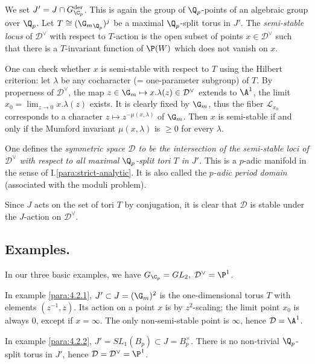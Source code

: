 \begin{para}\label{para:5.2.2}
 We set $J'=J\cap G_{\C_p}^{\mathrm{der}}$. This is
 again the group of $\Q_p$-points of an algebraic group over $\Q_p$. Let
 $T\cong ({\G_m}_{\Q_p})^j$ be a maximal $\Q_p$-split torus in $J'$. The
 {\it semi-stable locus} of $\mathcal{D}^\vee$ with respect to $T$-action
 is the open subset of points $x\in \mathcal{D}^\vee$ such that there is
 a $T$-invariant function of $\P(W)$ which does not vanish on $x$.


 One can check whether $x$ is semi-stable with respect to $T$ using the
 Hilbert criterion: let $\lambda$ be any cocharacter (= one-parameter
 subgroup) of $T$. By properness of $\mathcal{D}^\vee$, the map $z\in
 \G_m\mapsto x.\lambda(z)\in \mathcal{D}^\vee$ extends to $\A^1$, \ie the
 limit $\displaystyle x_0=\lim_{z\rightarrow 0} x.\lambda(z)$ exists. It
 is clearly fixed by $\G_m$, thus the fiber $\mathcal{L}_{x_0 }$
 corresponds to a character $z\mapsto z^{-\mu(x,\lambda)}$ of
 $\G_m$. Then $x$ is semi-stable if and only if the Mumford invariant
 $\mu(x,\lambda)$ is $\geq 0$ for every $\lambda$.
\end{para}

\begin{para}\label{para:5.2.3} One defines the {\it symmetric space
 $\mathcal{D}$ to be the intersection of the semi-stable loci 
 of $\mathcal{D}^\vee$ with respect to all maximal $\Q_p$-split tori $T$
 in $J'$.} This is a $p$-adic manifold in the sense of
 I.\ref{para:strict-analytic}.  It is
 also called the {\it $p$-adic period domain} (associated with the moduli
 problem).


 Since $J$ acts on the set of tori $T$ by conjugation, it is clear that
 $\mathcal{D}$ is stable under the $J$-action on $\mathcal{D}^{\vee}$.
\end{para}

 
\subsection{Examples.}\label{sub:5.3}

\begin{para}\label{para:5.3.1} In our three basic examples, we have
$G_{\C_p}=GL_2,\;\mathcal{D}^\vee=\P^1$.


In example \ref{para:4.2.1}, $J'\subset J=(\G_m)^2$ is the one-dimensional torus
$T$ with elements $(z^{-1},z)$. Its action on a point $x$ is by
$z^2$-scaling; the limit point $x_0$ is always $0$, except if
$x=\infty$. The only non-semi-stable point is $\infty$, hence
$\mathcal{D}=\A^1$.



In example \ref{para:4.2.2}, $J'=SL_1(B_p)\subset J=B_p^\times$. There is no
 non-trivial $\Q_p$-split torus in $J'$, hence
 $\mathcal{D}=\mathcal{D}^{\vee}=\P^1$.


\end{para}

